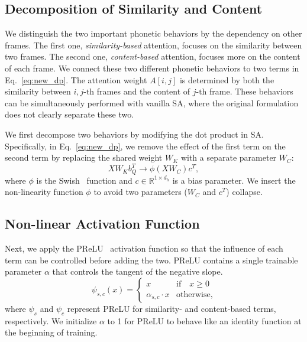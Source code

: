 \subsection{Decomposition of Similarity and Content}\label{ssec:decomposition}

We distinguish the two important phonetic behaviors by the dependency on other frames.
The first one, \textit{similarity-based} attention, focuses on the similarity between two frames.
The second one, \textit{content-based} attention, focuses more on the content of each frame.
We connect these two different phonetic behaviors to two terms in Eq.~\eqref{eq:new_dp}.
The attention weight $A[i,j]$ is determined by both the similarity between $i,j\text{-th}$ frames and the content of $j\text{-th}$ frame.
These behaviors can be simultaneously performed with vanilla SA, where the original formulation does not clearly separate these two.

We first decompose two behaviors by modifying the dot product in SA.
Specifically, in Eq.~\eqref{eq:new_dp}, we remove the effect of the first term on the second term by replacing the shared weight $W_K$ with a separate parameter $W_C$:
\begin{equation}
    XW_K b_Q^T \rightarrow \phi(XW_C)c^T \label{eq:content},
\end{equation}
where $\phi$ is the Swish~\cite{swish} function and $c \in \mathbb{R}^{1\times d_h}$ is a bias parameter.
We insert the non-linearity function $\phi$ to avoid two parameters ($W_C$ and $c^T$) collapse.

\subsection{Non-linear Activation Function}\label{ssec:nonlinear}

Next, we apply the PReLU~\cite{prelu} activation function so that the influence of each term can be controlled before adding the two.
PReLU contains a single trainable parameter $\alpha$ that controls the tangent of the negative slope.
\begin{equation}
    \psi_{s,c}(x) =
        \begin{cases}
            x                       & \text{if}\quad x \geq 0 \\
            \alpha_{s,c} \cdot x    & \text{otherwise},
        \end{cases}
\end{equation}
where $\psi_s$ and $\psi_c$ represent PReLU for similarity- and content-based terms, respectively.
We initialize $\alpha$ to 1 for PReLU to behave like an identity function at the beginning of training.

